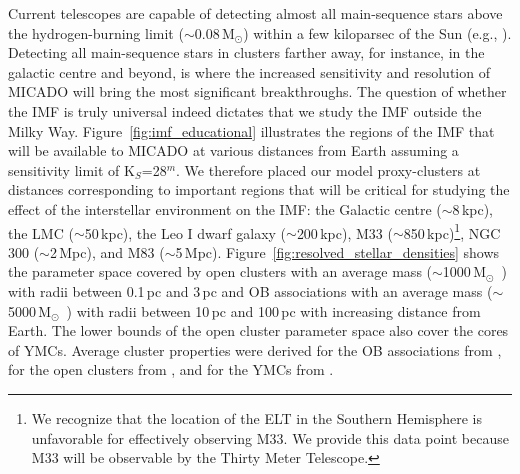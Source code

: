 \documentclass{aa}
\newcommand{\msun}{M$_\odot$~}
\newcommand{\msune}{M$_\odot$}
\newcommand{\s}{$\sim$}
\begin{document}
Current telescopes are capable of detecting almost all main-sequence stars above the hydrogen-burning limit (\s0.08\,\msune) within a few kiloparsec of the Sun (e.g., \citealt{muzic17}).
Detecting all main-sequence stars in clusters farther away, for instance, in the galactic centre and beyond, is where the increased sensitivity and resolution of MICADO will bring the most significant breakthroughs.
The question of whether the IMF is truly universal indeed dictates that we study the IMF outside the Milky Way.
Figure~\ref{fig:imf_educational} illustrates the regions of the IMF that will be available to MICADO at various distances from Earth assuming a sensitivity limit of K$_S$=28$^m$.
We therefore placed our model proxy-clusters at distances corresponding to important regions that will be critical for studying the effect of the interstellar environment on the IMF: the Galactic centre (\s8\,kpc), the LMC (\s50\,kpc), the Leo I dwarf galaxy (\s200\,kpc), M33 (\s850\,kpc)\footnote{We recognize that the location of the ELT in the Southern Hemisphere is unfavorable for effectively observing M33.
We provide this data point because M33 will be observable by the Thirty Meter Telescope.}, NGC 300 (\s2\,Mpc), and M83 (\s5\,Mpc).
Figure~\ref{fig:resolved_stellar_densities} shows the parameter space covered by open clusters with an average mass (\s1000\,\msun) with radii between 0.1\,pc and 3\,pc and OB associations with an average mass (\s5000\,\msun) with radii between 10\,pc and 100\,pc with increasing distance from Earth.
The lower bounds of the open cluster parameter space also cover the cores of YMCs. Average cluster properties were derived for the OB associations from \citet{melnik1995}, for the open clusters from \citet{piskunov2007}, and for the YMCs from \citet{portegies2010}.
\end{document}
